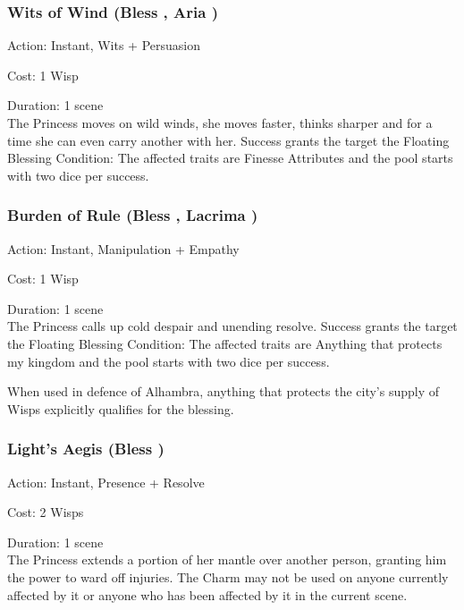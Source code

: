 \subsubsection*{Wits of Wind (Bless \textbullet\textbullet, Aria \textbullet)}

\noindent Action: Instant, Wits + Persuasion 

\noindent Cost: 1 Wisp

\noindent Duration: 1 scene \\

\noindent The Princess moves on wild winds, she moves faster, thinks sharper and for a time she can even carry another with her. Success grants the target the Floating Blessing Condition: The affected traits are Finesse Attributes and the pool starts with two dice per success. 

\subsubsection*{Burden of Rule (Bless \textbullet\textbullet, Lacrima \textbullet)}

\noindent Action: Instant, Manipulation + Empathy

\noindent Cost: 1 Wisp

\noindent Duration: 1 scene \\

\noindent The Princess calls up cold despair and unending resolve. Success grants the target the Floating Blessing Condition: The affected traits are Anything that protects my kingdom and the pool starts with two dice per success. 

When used in defence of Alhambra, anything that protects the city's supply of Wisps explicitly qualifies for the blessing. 

\subsubsection*{Light’s Aegis (Bless \textbullet\textbullet\textbullet)}

Action: Instant, Presence + Resolve

Cost: 2 Wisps

Duration: 1 scene \\

\noindent The Princess extends a portion of her mantle over another person, granting him the power to ward off injuries. The Charm may not be used on anyone currently affected by it or anyone who has been affected by it in the current scene. 

